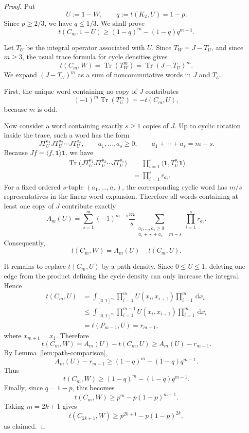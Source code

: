 \documentclass[11pt]{article}
\newcommand{\one}{\mathbf 1}
\newcommand{\Tr}{\operatorname{Tr}}
\newcommand{\dd}{\,\mathrm d}
\begin{document}
\begin{proof}
Put
\[
    U:=1-W,
    \qquad
    q:=t(K_2,U)=1-p.
\]
Since $p\ge 2/3$, we have $q\le 1/3$.  We shall prove
\[
    t(C_m,1-U)
    \ge
    (1-q)^m-(1-q)q^{m-1}.
\]

Let $T_U$ be the integral operator associated with $U$.  Since
$T_W=J-T_U$, and since $m\ge 3$, the usual trace formula for cycle
densities gives
\[
    t(C_m,W)=\Tr(T_W^m)=\Tr(J-T_U)^m.
\]
We expand $(J-T_U)^m$ as a sum of noncommutative words in $J$ and $T_U$.

First, the unique word containing no copy of $J$ contributes
\[
    (-1)^m\Tr(T_U^m)=-t(C_m,U),
\]
because $m$ is odd.

Now consider a word containing exactly $s\ge 1$ copies of $J$.  Up to cyclic
rotation inside the trace, such a word has the form
\[
    JT_U^{a_1}JT_U^{a_2}\cdots JT_U^{a_s},
    \qquad
    a_1,\dots,a_s\ge 0,
    \qquad
    a_1+\cdots+a_s=m-s.
\]
Because $Jf=\langle f,\one\rangle\one$, we have
\begin{align*}
    \Tr\bigl(JT_U^{a_1}JT_U^{a_2}\cdots JT_U^{a_s}\bigr)
    &=
    \prod_{i=1}^{s}\langle\one,T_U^{a_i}\one\rangle \\
    &=
    \prod_{i=1}^{s}r_{a_i}.
\end{align*}
For a fixed ordered $s$-tuple $(a_1,\dots,a_s)$, the corresponding cyclic
word has $m/s$ representatives in the linear word expansion.  Therefore
all words containing at least one copy of $J$ contribute exactly
\[
    A_m(U)
    =
    \sum_{s=1}^{m}(-1)^{m-s}\frac{m}{s}
    \sum_{\substack{a_1,\dots,a_s\ge 0\\ a_1+\cdots+a_s=m-s}}
    \prod_{i=1}^{s} r_{a_i}.
\]
Consequently,
\[
    t(C_m,W)=A_m(U)-t(C_m,U).
\]

It remains to replace $t(C_m,U)$ by a path density.  Since $0\le U\le 1$,
deleting one edge from the product defining the cycle density can only
increase the integral.  Hence
\begin{align*}
    t(C_m,U)
    &=
    \int_{[0,1]^m}
    \prod_{i=1}^{m}U(x_i,x_{i+1})
    \prod_{i=1}^{m}\dd x_i \\
    &\le
    \int_{[0,1]^m}
    \prod_{i=1}^{m-1}U(x_i,x_{i+1})
    \prod_{i=1}^{m}\dd x_i \\
    &=
    t(P_{m-1},U)
    =
    r_{m-1},
\end{align*}
where $x_{m+1}=x_1$.  Therefore
\[
    t(C_m,W)
    =A_m(U)-t(C_m,U)
    \ge
    A_m(U)-r_{m-1}.
\]
By Lemma~\ref{lem:path-comparison},
\[
    A_m(U)-r_{m-1}
    \ge
    (1-q)^m-(1-q)q^{m-1}.
\]
Thus
\[
    t(C_m,W)
    \ge
    (1-q)^m-(1-q)q^{m-1}.
\]
Finally, since $q=1-p$, this becomes
\[
    t(C_m,W)
    \ge
    p^m-p(1-p)^{m-1}.
\]
Taking $m=2k+1$ gives
\[
    t(C_{2k+1},W)
    \ge
    p^{2k+1}-p(1-p)^{2k},
\]
as claimed.
\end{proof}
\end{document}

